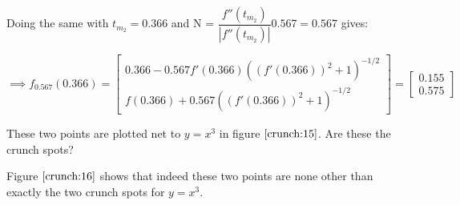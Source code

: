 Doing the same with $t_{m_2} = 0.366$ and N = $\dfrac{f''(t_{m_2})}{|f''(t_{m_2})|} 0.567 = 0.567$ gives:

\begin{center}
  \renewcommand\N{0.567}
  \renewcommand\temp{0.366}
  $
  \implies
  f_{\N}(\temp) =
  \begin{bmatrix}
    \temp - \N f'(\temp) ((f'(\temp))^2 + 1)^{-1/2} \\
    f(\temp) + \N ((f'(\temp))^2 + 1)^{-1/2}
  \end{bmatrix} =
  \begin{bmatrix}
    0.155 \\
    0.575
  \end{bmatrix}
  $
\end{center}

These two points are plotted net to $y = x^3$ in figure $\ref{crunch:15}$. Are these the crunch spots?

Figure $\ref{crunch:16}$ shows that indeed these two points are none other than exactly the two crunch spots for $y = x^3$.
